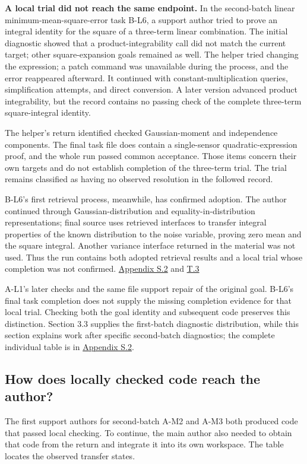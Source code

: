 \textbf{A local trial did not reach the same endpoint.} In the second-batch linear minimum-mean-square-error task B-L6, a support author tried to prove an integral identity for the square of a three-term linear combination. The initial diagnostic showed that a product-integrability call did not match the current target; other square-expansion goals remained as well. The helper tried changing the expression; a patch command was unavailable during the process, and the error reappeared afterward. It continued with constant-multiplication queries, simplification attempts, and direct conversion. A later version advanced product integrability, but the record contains no passing check of the complete three-term square-integral identity.

The helper's return identified checked Gaussian-moment and independence components. The final task file does contain a single-sensor quadratic-expression proof, and the whole run passed common acceptance. Those items concern their own targets and do not establish completion of the three-term trial. The trial remains classified as having no observed resolution in the followed record.

B-L6's first retrieval process, meanwhile, has confirmed adoption. The author continued through Gaussian-distribution and equality-in-distribution representations; final source uses retrieved interfaces to transfer integral properties of the known distribution to the noise variable, proving zero mean and the square integral. Another variance interface returned in the material was not used. Thus the run contains both adopted retrieval results and a local trial whose completion was not confirmed. \href{en-appendix.pdf\#s2}{Appendix S.2} and \href{en-appendix.pdf\#t3}{T.3}

A-L1's later checks and the same file support repair of the original goal. B-L6's final task completion does not supply the missing completion evidence for that local trial. Checking both the goal identity and subsequent code preserves this distinction. Section 3.3 supplies the first-batch diagnostic distribution, while this section explains work after specific second-batch diagnostics; the complete individual table is in \href{en-appendix.pdf\#s2}{Appendix S.2}.

\subsection[How does locally checked code reach the author?]{\texorpdfstring{\protect\hypertarget{section-5-4}{}How does locally checked code reach the author?}{How does locally checked code reach the author?}}
The first support authors for second-batch A-M2 and A-M3 both produced code that passed local checking. To continue, the main author also needed to obtain that code from the return and integrate it into its own workspace. The table locates the observed transfer states.

